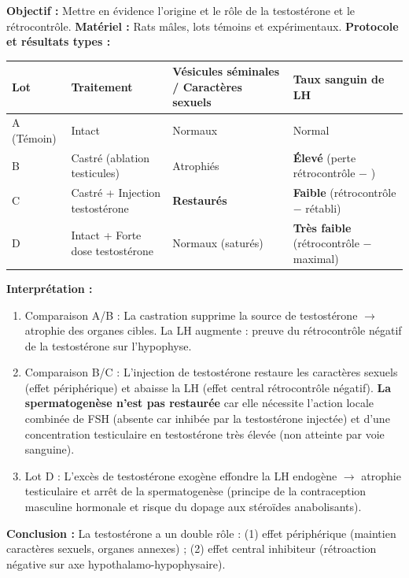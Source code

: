 \documentclass[11pt]{article}
\begin{document}
\begin{experience}
\textbf{Objectif :} Mettre en évidence l'origine et le rôle de la testostérone et le rétrocontrôle.
\textbf{Matériel :} Rats mâles, lots témoins et expérimentaux.
\textbf{Protocole et résultats types :}
\begin{center}
\begin{tabularx}{\linewidth}{|l|X|X|X|}\hline
\rowcolor{popblueL} Lot & Traitement & Vésicules séminales / Caractères sexuels & Taux sanguin de LH \\ \hline
A (Témoin) & Intact & Normaux & Normal \\ \hline
B & Castré (ablation testicules) & Atrophiés & \textbf{Élevé} (perte rétrocontrôle $-$ ) \\ \hline
C & Castré + Injection testostérone & \textbf{Restaurés} & \textbf{Faible} (rétrocontrôle $-$ rétabli) \\ \hline
D & Intact + Forte dose testostérone & Normaux (saturés) & \textbf{Très faible} (rétrocontrôle $-$ maximal) \\ \hline
\end{tabularx}
\end{center}
\textbf{Interprétation :}
\begin{enumerate}
\item Comparaison A/B : La castration supprime la source de testostérone $\rightarrow$ atrophie des organes cibles. La LH augmente : preuve du rétrocontrôle négatif de la testostérone sur l'hypophyse.
\item Comparaison B/C : L'injection de testostérone restaure les caractères sexuels (effet périphérique) et abaisse la LH (effet central rétrocontrôle négatif). \textbf{La spermatogenèse n'est pas restaurée} car elle nécessite l'action locale combinée de FSH (absente car inhibée par la testostérone injectée) et d'une concentration testiculaire en testostérone très élevée (non atteinte par voie sanguine).
\item Lot D : L'excès de testostérone exogène effondre la LH endogène $\rightarrow$ atrophie testiculaire et arrêt de la spermatogenèse (principe de la contraception masculine hormonale et risque du dopage aux stéroïdes anabolisants).
\end{enumerate}
\textbf{Conclusion :} La testostérone a un double rôle : (1) effet périphérique (maintien caractères sexuels, organes annexes) ; (2) effet central inhibiteur (rétroaction négative sur axe hypothalamo-hypophysaire).
\end{experience}
\end{document}
